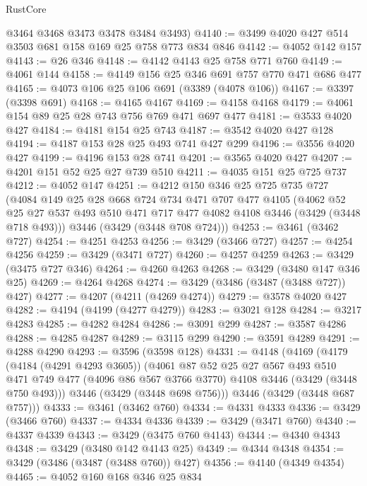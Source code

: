 \begin{lexlean}{RustCore}
\begin{coremodule}
      @3464
      @3468
      @3473
      @3478
      @3484
      @3493)
@4140 := @3499 @4020 @427 @514 @3503 @681 @158 @169 @25 @758 @773 @834 @846
@4142 := @4052 @142 @157
@4143 := @26 @346
@4148 := @4142 @4143 @25 @758 @771 @760
@4149 := @4061 @144
@4158 := @4149 @156 @25 @346 @691 @757 @770 @471 @686 @477
@4165 := @4073 @106 @25 @106 @691 (@3389 (@4078 @106))
@4167 := @3397 (@3398 @691)
@4168 := @4165 @4167
@4169 := @4158 @4168
@4179 := @4061 @154 @89 @25 @28 @743 @756 @769 @471 @697 @477
@4181 := @3533 @4020 @427
@4184 := @4181 @154 @25 @743
@4187 := @3542 @4020 @427 @128
@4194 := @4187 @153 @28 @25 @493 @741 @427 @299
@4196 := @3556 @4020 @427
@4199 := @4196 @153 @28 @741
@4201 := @3565 @4020 @427
@4207 := @4201 @151 @52 @25 @27 @739 @510
@4211 := @4035 @151 @25 @725 @737
@4212 := @4052 @147
@4251 := @4212
    @150
    @346
    @25
    @725
    @735
    @727
    (@4084
      @149
      @25
      @28
      @668
      @724
      @734
      @471
      @707
      @477
      @4105
      (@4062 @52 @25 @27 @537 @493 @510 @471 @717 @477 @4082 @4108 @3446 (@3429 (@3448 @718 @493)))
      @3446
      (@3429 (@3448 @708 @724)))
@4253 := @3461 (@3462 @727)
@4254 := @4251 @4253
@4256 := @3429 (@3466 @727)
@4257 := @4254 @4256
@4259 := @3429 (@3471 @727)
@4260 := @4257 @4259
@4263 := @3429 (@3475 @727 @346)
@4264 := @4260 @4263
@4268 := @3429 (@3480 @147 @346 @25)
@4269 := @4264 @4268
@4274 := @3429 (@3486 (@3487 (@3488 @727)) @427)
@4277 := @4207 (@4211 (@4269 @4274))
@4279 := @3578 @4020 @427
@4282 := @4194 (@4199 (@4277 @4279))
@4283 := @3021 @128
@4284 := @3217 @4283
@4285 := @4282 @4284
@4286 := @3091 @299
@4287 := @3587 @4286
@4288 := @4285 @4287
@4289 := @3115 @299
@4290 := @3591 @4289
@4291 := @4288 @4290
@4293 := @3596 (@3598 @128)
@4331 := @4148
    (@4169
      (@4179
        (@4184 (@4291 @4293 @3605))
        (@4061
          @87
          @52
          @25
          @27
          @567
          @493
          @510
          @471
          @749
          @477
          (@4096 @86 @567 @3766 @3770)
          @4108
          @3446
          (@3429 (@3448 @750 @493)))
        @3446
        (@3429 (@3448 @698 @756)))
      @3446
      (@3429 (@3448 @687 @757)))
@4333 := @3461 (@3462 @760)
@4334 := @4331 @4333
@4336 := @3429 (@3466 @760)
@4337 := @4334 @4336
@4339 := @3429 (@3471 @760)
@4340 := @4337 @4339
@4343 := @3429 (@3475 @760 @4143)
@4344 := @4340 @4343
@4348 := @3429 (@3480 @142 @4143 @25)
@4349 := @4344 @4348
@4354 := @3429 (@3486 (@3487 (@3488 @760)) @427)
@4356 := @4140 (@4349 @4354)
@4465 := @4052
    @160
    @168
    @346
    @25
    @834

\end{coremodule}
\end{lexlean}

